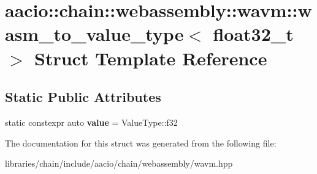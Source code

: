 \hypertarget{structaacio_1_1chain_1_1webassembly_1_1wavm_1_1wasm__to__value__type_3_01float32__t_01_4}{}\section{aacio\+:\+:chain\+:\+:webassembly\+:\+:wavm\+:\+:wasm\+\_\+to\+\_\+value\+\_\+type$<$ float32\+\_\+t $>$ Struct Template Reference}
\label{structaacio_1_1chain_1_1webassembly_1_1wavm_1_1wasm__to__value__type_3_01float32__t_01_4}
\subsection*{Static Public Attributes}
\begin{DoxyCompactItemize}
\item 
\mbox{\label{structaacio_1_1chain_1_1webassembly_1_1wavm_1_1wasm__to__value__type_3_01float32__t_01_4_a27e4cdd072192112e30911ac310e3099}} 
static constexpr auto {\bfseries value} = Value\+Type\+::f32
\end{DoxyCompactItemize}


The documentation for this struct was generated from the following file\+:\begin{DoxyCompactItemize}
\item 
libraries/chain/include/aacio/chain/webassembly/wavm.\+hpp\end{DoxyCompactItemize}
